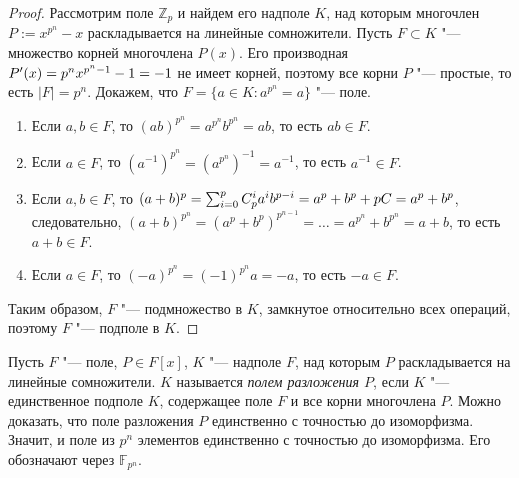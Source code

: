 \begin{proof}
	Рассмотрим поле $\mathbb{Z}_p$ и найдем его надполе $K$, над которым многочлен $P := x^{p^n} - x$ раскладывается на линейные сомножители. Пусть $F \subset K$ "--- множество корней многочлена $P(x)$. Его производная $P'(x) \hm{=} p^nx^{p^n - 1} - 1 = -1$ не имеет корней, поэтому все корни $P$ "--- простые, то есть $|F| = p^n$. Докажем, что $F = \{a \in K: a^{p^n} = a\}$ "--- поле.		
	\begin{enumerate}
		\item Если $a, b \in F$, то $(ab)^{p^n} = a^{p^n}b^{p^n} = ab$, то есть $ab \in F$.
		\item Если $a \in F$, то $(a^{-1})^{p^n} = (a^{p^n})^{-1} = a^{-1}$, то есть $a^{-1} \in F$.
		\item Если $a, b \in F$, то $(a + b)^p = \sum_{i = 0}^{p}C_p^ia^ib^{p - i} = a^p + b^p + pC \hm{=} a^p + b^p$, следовательно, $(a + b)^{p^n} = (a^p + b^p)^{p^{n - 1}} = \dots = a^{p^n} + b^{p^n} = a + b$, то есть $a + b \in F$.
		\item Если $a \in F$, то $(-a)^{p^n} = (-1)^{p^n}a = -a$, то есть $-a \in F$.
	\end{enumerate}
	
	Таким образом, $F$ "--- подмножество в $K$, замкнутое относительно всех операций, поэтому $F$ "--- подполе в $K$.
\end{proof}

\begin{note}
	Пусть $F$ "--- поле, $P \in F[x]$, $K$ "--- надполе $F$, над которым $P$ раскладывается на линейные сомножители. $K$ называется \textit{полем разложения $P$}, если $K$ "--- единственное подполе $K$, содержащее поле $F$ и все корни многочлена $P$. Можно доказать, что поле разложения $P$ единственно с точностью до изоморфизма. Значит, и поле из $p^n$ элементов единственно с точностью до изоморфизма. Его обозначают через $\mathbb{F}_{p^n}$.
\end{note}